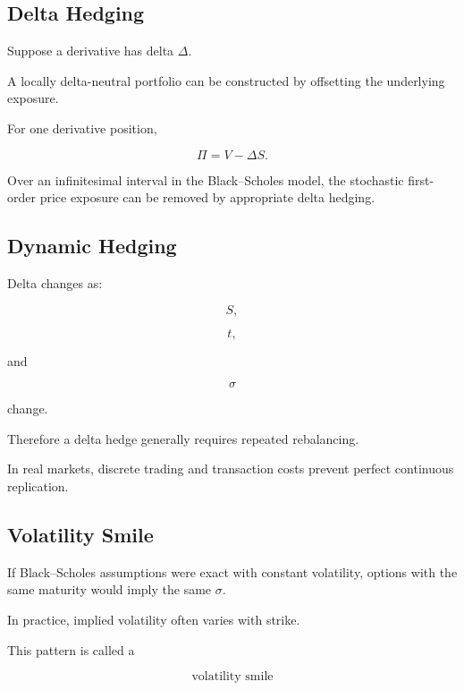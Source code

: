 \subsection{Delta Hedging}
\label{subsec:delta-hedging}

Suppose a derivative has delta \(\Delta\).

A locally delta-neutral portfolio can be constructed by offsetting the
underlying exposure.

For one derivative position,

\[
\boxed{
\Pi
=
V-\Delta S.
}
\]

Over an infinitesimal interval in the Black--Scholes model, the stochastic
first-order price exposure can be removed by appropriate delta hedging.

\subsection{Dynamic Hedging}
\label{subsec:dynamic-hedging}

Delta changes as:

\[
\boxed{
S,
}
\]

\[
\boxed{
t,
}
\]

and

\[
\boxed{
\sigma
}
\]

change.

Therefore a delta hedge generally requires repeated rebalancing.

In real markets, discrete trading and transaction costs prevent perfect
continuous replication.

\subsection{Volatility Smile}
\label{subsec:volatility-smile}

If Black--Scholes assumptions were exact with constant volatility, options
with the same maturity would imply the same \(\sigma\).

In practice, implied volatility often varies with strike.

This pattern is called a

\[
\boxed{
\text{volatility smile}
}
\]

